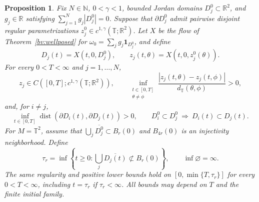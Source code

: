 \documentclass[11pt]{amsart}
\newtheorem{proposition}[theorem]{Proposition}
\theoremstyle{remark}
\numberwithin{equation}{section}
\newcommand{\R}{\mathbb R}
\newcommand{\T}{\mathbb T}
\begin{document}
\begin{proposition}
\label{np:continuation}
Fix $N\in\mathbb N$, $0<\gamma<1$, bounded Jordan domains
$D_j^0\subset\R^2$, and $g_j\in\R$ satisfying
$\sum_{j=1}^Ng_j|D_j^0|=0$. Suppose that $\partial D_j^0$ admit
pairwise disjoint regular parametrizations
$z_j^0\in c^{1,\gamma}(\T;\R^2)$. Let $X$ be the flow of
Theorem~\ref{bv:wellposed} for
$\omega_0=\sum_jg_j\mathbf1_{D_j^0}$, and define
\[
 D_j(t)=X(t,0,D_j^0),\qquad z_j(t,\theta)=X(t,0,z_j^0(\theta)).
\]
For every $0<T<\infty$ and $j=1,\ldots,N$,
\[
 z_j\in C([0,T];c^{1,\gamma}(\T;\R^2)),\qquad
 \inf_{\substack{t\in[0,T]\\\theta\ne\phi}}
 \frac{|z_j(t,\theta)-z_j(t,\phi)|}{d_\T(\theta,\phi)}>0,
\]
and, for $i\ne j$,
\[
 \inf_{t\in[0,T]}\operatorname{dist}(\partial D_i(t),\partial D_j(t))>0,
 \qquad
 D_i^0\subset D_j^0\ \Longrightarrow\ D_i(t)\subset D_j(t).
\]
For $M=\T^2$, assume that $\bigcup_j\overline{D_j^0}\subset B_r(0)$
and $B_{4r}(0)$ is an injectivity neighborhood. Define
\[
 \tau_r=\inf\left\{t\ge0:
       \bigcup_j\overline{D_j(t)}\not\subset B_r(0)\right\},
 \qquad\inf\varnothing=\infty.
\]
The same regularity and positive lower bounds hold on
$[0,\min\{T,\tau_r\}]$ for every $0<T<\infty$, including $t=\tau_r$
if $\tau_r<\infty$. All bounds may depend on $T$ and the finite initial family.
\end{proposition}
\end{document}
